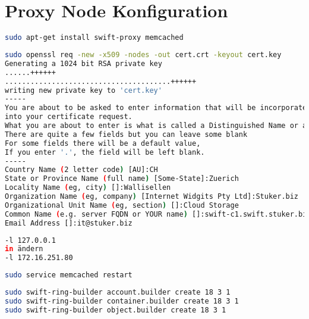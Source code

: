 \section{Proxy Node Konfiguration}
\begin{lstlisting}[label=paketeProxy, language=Bash, caption=Installation Proxy-Node Pakete ]
sudo apt-get install swift-proxy memcached
\end{lstlisting}

\begin{lstlisting}[label=df, language=Bash, caption=X.509 Zertifikats in /etc/swift erstellen ]
sudo openssl req -new -x509 -nodes -out cert.crt -keyout cert.key
Generating a 1024 bit RSA private key
......++++++
.......................................++++++
writing new private key to 'cert.key'
-----
You are about to be asked to enter information that will be incorporated
into your certificate request.
What you are about to enter is what is called a Distinguished Name or a DN.
There are quite a few fields but you can leave some blank
For some fields there will be a default value,
If you enter '.', the field will be left blank.
-----
Country Name (2 letter code) [AU]:CH
State or Province Name (full name) [Some-State]:Zuerich
Locality Name (eg, city) []:Wallisellen
Organization Name (eg, company) [Internet Widgits Pty Ltd]:Stuker.biz
Organizational Unit Name (eg, section) []:Cloud Storage
Common Name (e.g. server FQDN or YOUR name) []:swift-c1.swift.stuker.biz
Email Address []:it@stuker.biz
\end{lstlisting}

\begin{lstlisting}[label=memcachedconf, language=Bash, caption=MemCached in /etc/memcached.conf konfigurieren ]
-l 127.0.0.1
in ändern
-l 172.16.251.80
\end{lstlisting}

\begin{lstlisting}[label=startMemcached, language=Bash, caption=Memcached starten]
sudo service memcached restart
\end{lstlisting}

\begin{lstlisting}[label=ring, language=Bash, caption=Account Container und Object Ring erstellen]
sudo swift-ring-builder account.builder create 18 3 1
sudo swift-ring-builder container.builder create 18 3 1
sudo swift-ring-builder object.builder create 18 3 1
\end{lstlisting}

